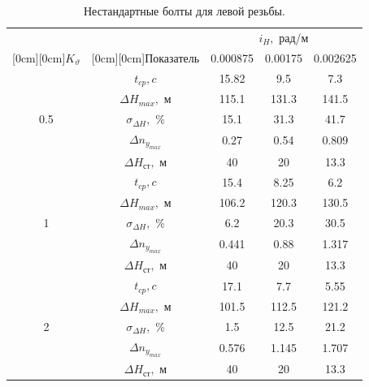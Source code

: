 \documentclass[a4paper,12pt]{article}
\begin{document}
\begin{enumerate}
    \begin{table}[H]
        \caption{\label{tab:Результаты расчётов} Нестандартные болты для левой резьбы.}
        \begin{center}
            \begin{tabular}{|c|c|c|c|c|}
            \hline
            & \multicolumn{1}{|c|}{} & \multicolumn{3}{|c|}{$i_H,$ рад/м}  \\
            \cline{3-5}
            \raisebox{1.5ex}[0cm][0cm]{$K_{\vartheta}$} & \raisebox{1.5ex}[0cm][0cm]{Показатель}
            & 0.000875 & 0.00175 &0.002625\\
            \hline
            & $t_{cp}, c$ & 15.82 & 9.5 & 7.3\\ 
            \cline{2-5} 
            & $\Delta H_{max},$ м & 115.1 & 131.3 & 141.5\\ 
            \cline{2-5} 
            0.5& $\sigma_{\Delta H},$ \% & 15.1 & 31.3 & 41.7\\ 
            \cline{2-5} 
            & $\Delta n_{y_{max}}$ & 0.27 & 0.54 & 0.809\\ 
            \cline{2-5} 
            & $\Delta H_{ст},$ м & 40 & 20 & 13.3\\ 
            \hline
            & $t_{cp}, c$ & 15.4 & 8.25 & 6.2\\
            \cline{2-5} 
            & $\Delta H_{max},$ м & 106.2 & 120.3 & 130.5\\ 
            \cline{2-5} 
            1& $\sigma_{\Delta H},$ \% & 6.2 & 20.3 & 30.5\\ 
            \cline{2-5} 
            & $\Delta n_{y_{max}}$ & 0.441 & 0.88 & 1.317\\ 
            \cline{2-5} 
            & $\Delta H_{ст},$ м & 40 & 20 & 13.3\\
            \hline
            & $t_{cp}, c$ & 17.1 & 7.7 & 5.55\\
            \cline{2-5} 
            & $\Delta H_{max},$ м & 101.5 & 112.5 & 121.2\\ 
            \cline{2-5} 
            2& $\sigma_{\Delta H},$ \% & 1.5 & 12.5 & 21.2\\ 
            \cline{2-5} 
            & $\Delta n_{y_{max}}$ & 0.576 & 1.145 & 1.707\\ 
            \cline{2-5} 
            & $\Delta H_{ст},$ м & 40 & 20 & 13.3\\ 
            \hline
            \end{tabular}
        \end{center}
    \end{table}


\end{enumerate}
\end{document}
